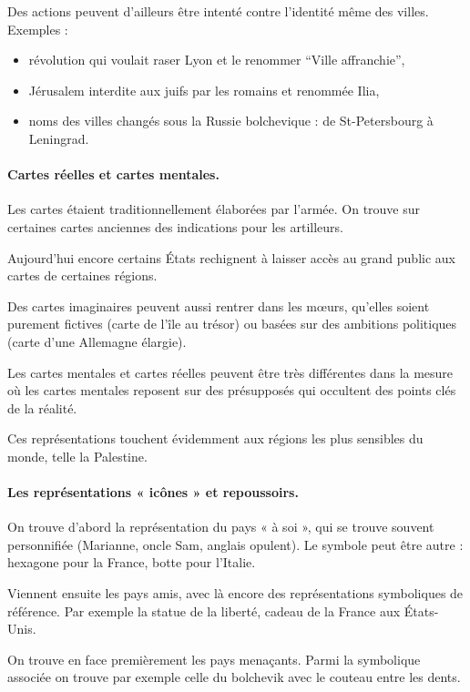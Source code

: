 \documentclass[a4paper,10pt]{article}
\begin{document}
		Des actions peuvent d'ailleurs être intenté contre l'identité même des villes.
		Exemples :
		\begin{itemize}
		\item révolution qui voulait raser Lyon et le renommer “Ville affranchie”,
		\item Jérusalem interdite aux juifs par les romains et renommée Ilia,
		\item noms des villes changés sous la Russie bolchevique : de St-Petersbourg à Leningrad.
		\end{itemize}

		\paragraph{Cartes réelles et cartes mentales.}

		Les cartes étaient traditionnellement élaborées par l'armée.
		On trouve sur certaines cartes anciennes des indications pour les artilleurs.

		Aujourd'hui encore certains États rechignent à laisser accès au grand public aux cartes de certaines régions.

		Des cartes imaginaires peuvent aussi rentrer dans les mœurs, qu'elles soient purement fictives (carte de l'île au trésor) ou basées sur des ambitions politiques (carte d'une Allemagne élargie).

		Les cartes mentales et cartes réelles peuvent être très différentes dans la mesure où les cartes mentales reposent sur des présupposés qui occultent des points clés de la réalité.

		Ces représentations touchent évidemment aux régions les plus sensibles du monde, telle la Palestine.

		\paragraph{Les représentations « icônes » et repoussoirs.}

		On trouve d'abord la représentation du pays « à soi », qui se trouve souvent personnifiée (Marianne, oncle Sam, anglais opulent).
		Le symbole peut être autre : hexagone pour la France, botte pour l'Italie.

		Viennent ensuite les pays amis, avec là encore des représentations symboliques de référence.
		Par exemple la statue de la liberté, cadeau de la France aux États-Unis.

		On trouve en face premièrement les pays menaçants.
		Parmi la symbolique associée on trouve par exemple celle du bolchevik avec le couteau entre les dents.
\end{document}
